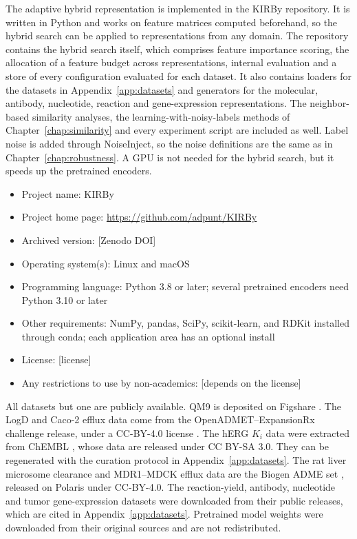 The adaptive hybrid representation is implemented in the KIRBy repository. It is written in Python and works on feature matrices computed beforehand, so the hybrid search can be applied to representations from any domain. The repository contains the hybrid search itself, which comprises feature importance scoring, the allocation of a feature budget across representations, internal evaluation and a store of every configuration evaluated for each dataset. It also contains loaders for the datasets in Appendix~\ref{app:datasets} and generators for the molecular, antibody, nucleotide, reaction and gene-expression representations. The neighbor-based similarity analyses, the learning-with-noisy-labels methods of Chapter~\ref{chap:similarity} and every experiment script are included as well. Label noise is added through NoiseInject, so the noise definitions are the same as in Chapter~\ref{chap:robustness}. A GPU is not needed for the hybrid search, but it speeds up the pretrained encoders.

\begin{itemize}
    \item Project name: KIRBy
    \item Project home page: \url{https://github.com/adpunt/KIRBy}
    \item Archived version: [Zenodo DOI]
    \item Operating system(s): Linux and macOS
    \item Programming language: Python 3.8 or later; several pretrained encoders need Python 3.10 or later
    \item Other requirements: NumPy, pandas, SciPy, scikit-learn, and RDKit installed through conda; each application area has an optional install
    \item License: [license]
    \item Any restrictions to use by non-academics: [depends on the license]
\end{itemize}


All datasets but one are publicly available. QM9 \citep{Ramakrishnan2014} is deposited on Figshare \citep{qm9_dataset}. The LogD and Caco-2 efflux data come from the OpenADMET--ExpansionRx challenge release, under a CC-BY-4.0 license \citep{openadmet}. The hERG $K_i$ data were extracted from ChEMBL \citep{Zdrazil2023}, whose data are released under CC BY-SA 3.0. They can be regenerated with the curation protocol in Appendix~\ref{app:datasets}. The rat liver microsome clearance and MDR1--MDCK efflux data are the Biogen ADME set \citep{fang2023}, released on Polaris \citep{polaris} under CC-BY-4.0. The reaction-yield, antibody, nucleotide and tumor gene-expression datasets were downloaded from their public releases, which are cited in Appendix~\ref{app:datasets}. Pretrained model weights were downloaded from their original sources and are not redistributed.

